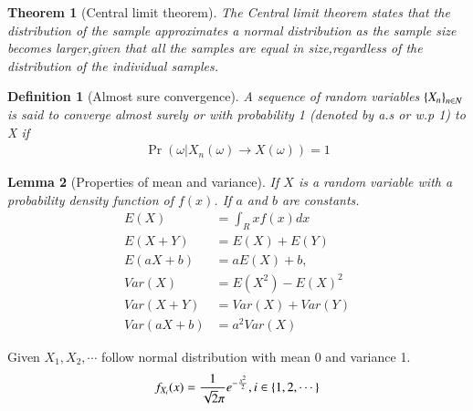 \documentclass[journal,12pt,twocolumn]{IEEEtran}
\newtheorem{definition}{Definition}[section]
\newtheorem{theorem}{Theorem}[section]
\newtheorem{lemma}[theorem]{Lemma}
\begin{document}
\begin{theorem}[Central limit theorem]
\label{theorem3}
The Central limit theorem states that the distribution of the sample approximates a normal distribution as the sample size becomes larger,given that all the samples are equal in size,regardless of the distribution of the individual samples.\label{central}
\end{theorem}



\begin{definition}[Almost sure convergence]
A sequence of random variables $\left\{X_n\right\}_{n\in N}$ is said to converge almost surely or with probability 1 (denoted by a.s or w.p 1) to X if \label{with prob 1}
\begin{align}
    \Pr(\omega |X_n(\omega) \to X(\omega))=1
\end{align}
\end{definition}

\begin{lemma}[Properties of mean and variance]
If $X$ is a random variable with a probability density function of $f(x)$. If $a$ and $b$ are constants.
\begin{align}
    \label{1}
    E(X)&=\int_R xf(x)dx\\ 
    \label{2}
    E(X+Y)&=E(X)+E(Y)\\    
    \label{3}
    E(aX+b)&=aE(X)+b, \\   
    \label{4}
    Var(X)&=E(X^2)-{E(X)}^2\\  
    \label{5}
    Var(X+Y)&=Var(X)+Var(Y)\\  
    \label{6}
    Var(aX+b)&=a^2 Var(X)
    
\end{align}
\end{lemma}




Given $X_1,X_2, \cdots$ follow normal distribution with mean 0 and variance 1.
\begin{align}
    f_{X_i}(x)=\frac{1}{\sqrt{2}\pi}e^{-\frac{x^2}{2}} ,i \in \left\{1,2,\cdots\right\}
\end{align}
\end{document}

